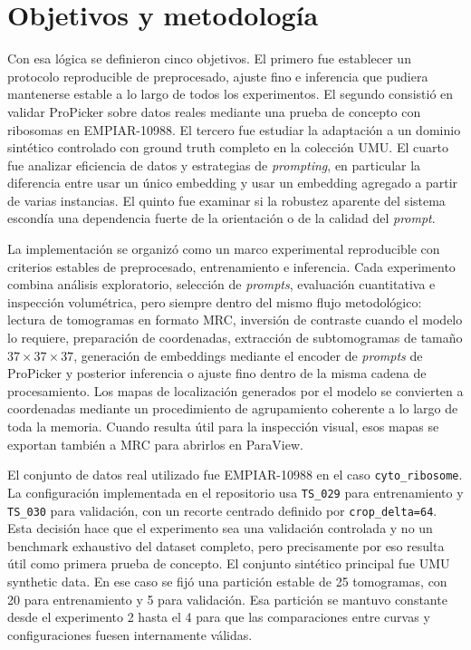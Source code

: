 \documentclass[12pt,a4paper]{report}
\begin{document}
\section*{Objetivos y metodología}
Con esa lógica se definieron cinco objetivos. El primero fue establecer un protocolo reproducible de preprocesado, ajuste fino e inferencia que pudiera mantenerse estable a lo largo de todos los experimentos. El segundo consistió en validar ProPicker sobre datos reales mediante una prueba de concepto con ribosomas en EMPIAR-10988. El tercero fue estudiar la adaptación a un dominio sintético controlado con ground truth completo en la colección UMU. El cuarto fue analizar eficiencia de datos y estrategias de \emph{prompting}, en particular la diferencia entre usar un único embedding y usar un embedding agregado a partir de varias instancias. El quinto fue examinar si la robustez aparente del sistema escondía una dependencia fuerte de la orientación o de la calidad del \emph{prompt}.

La implementación se organizó como un marco experimental reproducible con criterios estables de preprocesado, entrenamiento e inferencia. Cada experimento combina análisis exploratorio, selección de \emph{prompts}, evaluación cuantitativa e inspección volumétrica, pero siempre dentro del mismo flujo metodológico: lectura de tomogramas en formato MRC, inversión de contraste cuando el modelo lo requiere, preparación de coordenadas, extracción de subtomogramas de tamaño \(37 \times 37 \times 37\), generación de embeddings mediante el encoder de \emph{prompts} de ProPicker y posterior inferencia o ajuste fino dentro de la misma cadena de procesamiento. Los mapas de localización generados por el modelo se convierten a coordenadas mediante un procedimiento de agrupamiento coherente a lo largo de toda la memoria. Cuando resulta útil para la inspección visual, esos mapas se exportan también a MRC para abrirlos en ParaView.

El conjunto de datos real utilizado fue EMPIAR-10988 en el caso \texttt{cyto\_ribosome}. La configuración implementada en el repositorio usa \texttt{TS\_029} para entrenamiento y \texttt{TS\_030} para validación, con un recorte centrado definido por \texttt{crop\_delta=64}. Esta decisión hace que el experimento sea una validación controlada y no un benchmark exhaustivo del dataset completo, pero precisamente por eso resulta útil como primera prueba de concepto. El conjunto sintético principal fue UMU synthetic data. En ese caso se fijó una partición estable de 25 tomogramas, con 20 para entrenamiento y 5 para validación. Esa partición se mantuvo constante desde el experimento 2 hasta el 4 para que las comparaciones entre curvas y configuraciones fuesen internamente válidas.
\end{document}
